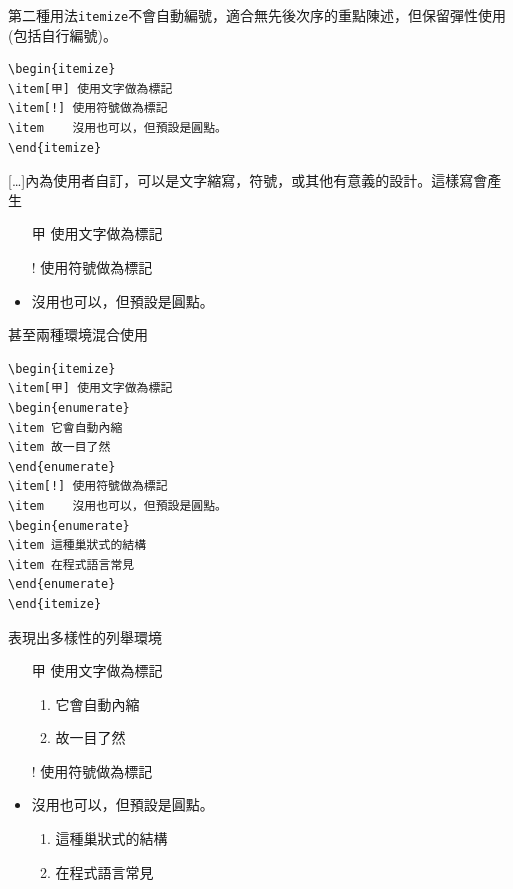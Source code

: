 第二種用法{\tt itemize}不會自動編號，適合無先後次序的重點陳述，但保留彈性使用(包括自行編號)。
\\
\begin{Verbatim}[frame=single,firstline=1,label=Itemize]
\begin{itemize}
\item[甲] 使用文字做為標記
\item[!] 使用符號做為標記
\item    沒用也可以，但預設是圓點。
\end{itemize}
\end{Verbatim}
[\ldots]內為使用者自訂，可以是文字縮寫，符號，或其他有意義的設計。這樣寫會產生
\begin{itemize}
\item[甲] 使用文字做為標記
\item[!] 使用符號做為標記
\item    沒用也可以，但預設是圓點。
\end{itemize}
甚至兩種環境混合使用\\
\begin{Verbatim}[frame=single,firstline=1,label=Enumerate+Itemize]
\begin{itemize}
\item[甲] 使用文字做為標記
\begin{enumerate}
\item 它會自動內縮
\item 故一目了然
\end{enumerate}
\item[!] 使用符號做為標記
\item    沒用也可以，但預設是圓點。
\begin{enumerate}
\item 這種巢狀式的結構
\item 在程式語言常見
\end{enumerate}
\end{itemize}
\end{Verbatim}
表現出多樣性的列舉環境
\begin{itemize}
\item[甲] 使用文字做為標記
\begin{enumerate}
\item 它會自動內縮
\item 故一目了然
\end{enumerate}
\item[!] 使用符號做為標記
\item    沒用也可以，但預設是圓點。
\begin{enumerate}
\item 這種巢狀式的結構
\item 在程式語言常見
\end{enumerate}
\end{itemize}

